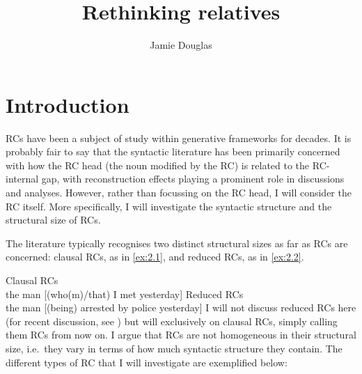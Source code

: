 \documentclass[output=paper]{langsci/langscibook}
\author{Jamie Douglas\affiliation{University of Cambridge}}
\title{Rethinking relatives}
\begin{document}
\glsresetall

\section{Introduction}\label{sec:02.1}

\Glspl{RC} have been a subject of study within generative frameworks for
decades. It is probably fair to say that the syntactic literature has been
primarily concerned with how the \gls{RC} head (the noun
modified by the RC) is related to the RC-internal gap, with reconstruction
effects playing a prominent role in discussions and analyses. However, rather
than focussing on the \gls{RC} head, I will consider the \gls{RC} itself.  More specifically, I will investigate the syntactic structure
and the structural size of  \glspl{RC}.

The literature typically recognises two distinct structural sizes as far as RCs
are concerned: clausal RCs, as in \eqref{ex:2.1}, and reduced RCs, as in \eqref{ex:2.2}.

\ea\label{ex:2.1} Clausal RCs\\
    the man [(who(m)/that) I met yesterday]
\ex\label{ex:2.2} Reduced RCs\\
    the man [(being) arrested by police yesterday]
\z
I will not discuss reduced \glspl{RC} here (for recent discussion, see
\citealt{Douglas2016,Harwood2017}) but will  exclusively on clausal RCs,
simply calling them \glspl{RC} from now on. I argue that \glspl{RC} are not
homogeneous in their structural size, i.e.\ they vary in terms of how much
syntactic structure they contain. The different types of \gls{RC} that I will
investigate are exemplified below:
\end{document}
